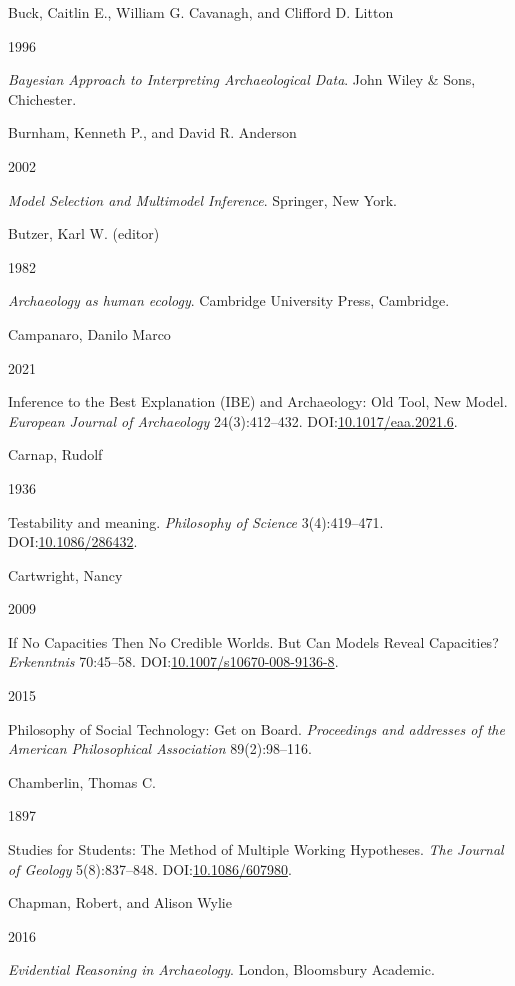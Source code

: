 \documentclass[
  a4paper,
  oneside]{uiophdthesis}
\newlength{\cslhangindent}
\newlength{\csllabelwidth}
\newlength{\cslentryspacingunit} %
\newenvironment{CSLReferences}[2] %
 {%
  \setlength{\parindent}{0pt}
  \ifodd #1
  \let\oldpar\par
  \def\par{\hangindent=\cslhangindent\oldpar}
  \fi
  \setlength{\parskip}{#2\cslentryspacingunit}
 }%
 {}
\newcommand{\CSLBlock}[1]{#1\hfill\break}
\newcommand{\CSLLeftMargin}[1]{\parbox[t]{\csllabelwidth}{#1}}
\newcommand{\CSLRightInline}[1]{\parbox[t]{\linewidth - \csllabelwidth}{#1}\break}
\begin{document}
\begin{CSLReferences}{0}{0}
\leavevmode{}%
\CSLBlock{Buck, Caitlin E., William G. Cavanagh, and Clifford D. Litton}
\CSLLeftMargin{ 1996}
\CSLRightInline{\emph{{Bayesian Approach to Interpreting Archaeological Data}}. John Wiley \& Sons, Chichester.}

\leavevmode{}%
\CSLBlock{Burnham, Kenneth P., and David R. Anderson}
\CSLLeftMargin{ 2002}
\CSLRightInline{\emph{{Model Selection and Multimodel Inference}}. Springer, New York.}

\leavevmode{}%
\CSLBlock{Butzer, Karl W. (editor)}
\CSLLeftMargin{ 1982}
\CSLRightInline{\emph{{Archaeology as human ecology}}. Cambridge University Press, Cambridge.}

\leavevmode{}%
\CSLBlock{Campanaro, Danilo Marco}
\CSLLeftMargin{ 2021}
\CSLRightInline{{Inference to the Best Explanation (IBE) and Archaeology: Old Tool, New Model}. \emph{European Journal of Archaeology} 24(3):412--432. DOI:\href{https://doi.org/10.1017/eaa.2021.6}{10.1017/eaa.2021.6}.}

\leavevmode{}%
\CSLBlock{Carnap, Rudolf}
\CSLLeftMargin{ 1936}
\CSLRightInline{Testability and meaning. \emph{Philosophy of Science} 3(4):419--471. DOI:\href{https://doi.org/10.1086/286432}{10.1086/286432}.}

\leavevmode{}%
\CSLBlock{Cartwright, Nancy}
\CSLLeftMargin{ 2009}
\CSLRightInline{{If No Capacities Then No Credible Worlds. But Can Models Reveal Capacities?} \emph{Erkenntnis} 70:45--58. DOI:\href{https://doi.org/10.1007/s10670-008-9136-8}{10.1007/s10670-008-9136-8}.}

\leavevmode{}%
\CSLLeftMargin{ 2015 }
\CSLRightInline{{Philosophy of Social Technology: Get on Board}. \emph{Proceedings and addresses of the American Philosophical Association} 89(2):98--116.}

\leavevmode{}%
\CSLBlock{Chamberlin, Thomas C.}
\CSLLeftMargin{ 1897}
\CSLRightInline{{Studies for Students: The Method of Multiple Working Hypotheses}. \emph{The Journal of Geology} 5(8):837--848. DOI:\href{https://doi.org/10.1086/607980}{10.1086/607980}.}

\leavevmode{}%
\CSLBlock{Chapman, Robert, and Alison Wylie}
\CSLLeftMargin{ 2016}
\CSLRightInline{\emph{{Evidential Reasoning in Archaeology}}. London, Bloomsbury Academic.}


\end{CSLReferences}
\end{document}
